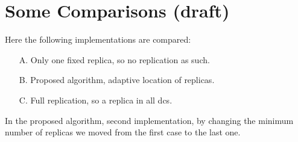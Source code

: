 \documentclass{acm_proc_article-sp}
\begin{document}
\section{Some Comparisons (draft)}
Here the following implementations are compared:
\begin{itemize}
	\item[A.] Only one fixed replica, so no replication as such.
	
	\item[B.] Proposed algorithm, adaptive location of replicas.

	\item[C.] Full replication, so a replica in all \glspl{dc}.
\end{itemize}

In the proposed algorithm, second implementation, by changing the minimum number of replicas we moved from the first case to the last one.
\end{document}
